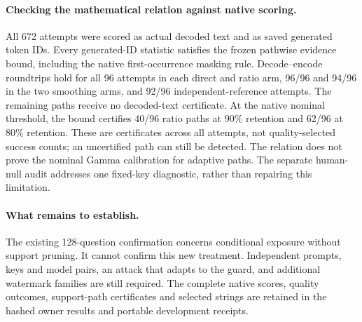 \paragraph{Checking the mathematical relation against native scoring.}
All 672 attempts were scored as actual decoded text and as saved generated token IDs. Every generated-ID statistic satisfies the frozen pathwise evidence bound, including the native first-occurrence masking rule. Decode--encode roundtrips hold for all 96 attempts in each direct and ratio arm, 96/96 and 94/96 in the two smoothing arms, and 92/96 independent-reference attempts. The remaining paths receive no decoded-text certificate. At the native nominal threshold, the bound certifies 40/96 ratio paths at 90\% retention and 62/96 at 80\% retention. These are certificates across all attempts, not quality-selected success counts; an uncertified path can still be detected. The relation does not prove the nominal Gamma calibration for adaptive paths. The separate human-null audit addresses one fixed-key diagnostic, rather than repairing this limitation.

\paragraph{What remains to establish.}
The existing 128-question confirmation concerns conditional exposure without support pruning. It cannot confirm this new treatment. Independent prompts, keys and model pairs, an attack that adapts to the guard, and additional watermark families are still required. The complete native scores, quality outcomes, support-path certificates and selected strings are retained in the hashed owner results and portable development receipts.
